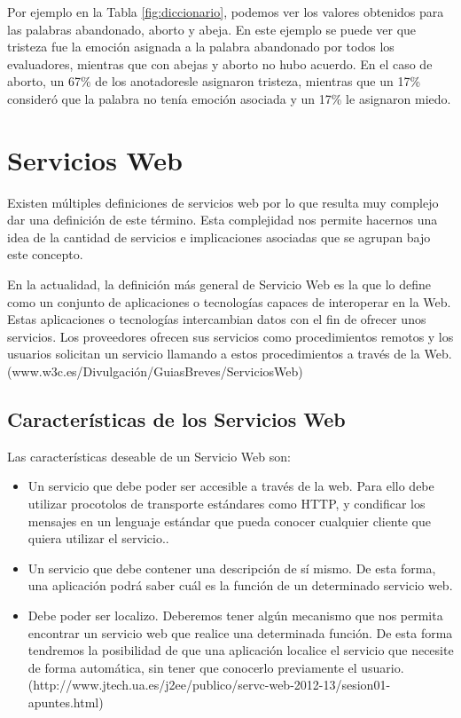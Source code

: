Por ejemplo en la Tabla \ref{fig:diccionario}, podemos ver los valores obtenidos para las palabras abandonado, aborto y abeja. En este ejemplo se puede ver que tristeza fue la emoción asignada a la palabra abandonado por todos los evaluadores, mientras que con abejas y aborto no hubo acuerdo. En el caso de aborto, un 67\% de los anotadoresle asignaron tristeza, mientras que un 17\% consideró que la palabra no tenía emoción asociada y un 17\% le asignaron miedo.

\section{Servicios Web}
\label{cap2:sec:servicios_web}

	Existen múltiples definiciones de servicios web por lo que resulta muy complejo dar una definición de este término. Esta complejidad nos permite hacernos una idea de la cantidad de servicios e implicaciones asociadas que se agrupan bajo este concepto. 
	
	En la actualidad, la definición más general de Servicio Web es la que lo define como un conjunto de aplicaciones o tecnologías capaces de interoperar en la Web. Estas aplicaciones o tecnologías intercambian datos con el fin de ofrecer unos servicios. Los proveedores ofrecen sus servicios como procedimientos remotos y los usuarios solicitan un servicio llamando a estos procedimientos a través de la Web. (www.w3c.es/Divulgación/GuiasBreves/ServiciosWeb)
	
	\subsection{Características de los Servicios Web}	
	\label{cap2:subsec:servicios_web}
	
	Las características deseable de un Servicio Web son:
	\begin{itemize}
		\item Un servicio que debe poder ser accesible a través de la web. Para ello debe utilizar procotolos de transporte estándares como HTTP, y condificar los mensajes en un lenguaje estándar que pueda conocer cualquier cliente que quiera utilizar el servicio..
		\item Un servicio que debe contener una descripción de sí mismo. De esta forma, una aplicación podrá saber cuál es la función de un determinado servicio web.
		\item Debe poder ser localizo. Deberemos tener algún mecanismo que nos permita encontrar un servicio web que realice una determinada función. De esta forma tendremos la posibilidad de que una aplicación localice el servicio que necesite de forma automática, sin tener que conocerlo previamente el usuario. (http://www.jtech.ua.es/j2ee/publico/servc-web-2012-13/sesion01-apuntes.html)
	\end{itemize}


